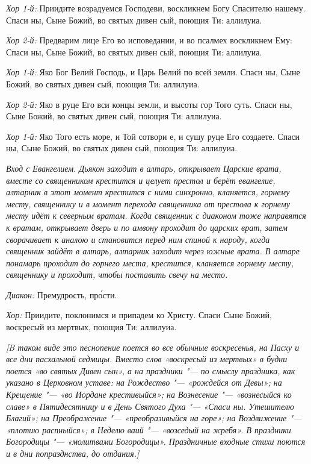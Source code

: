\begin{mymulticols}
{\itshape Хор 1-й:} Приидите возрадуемся Господеви, воскликнем Богу Спасителю нашему. Спаси ны, Сыне Божий, во святых дивен сый, поющия Ти: аллилуиа. 

{\itshape Хор 2-й:} Предварим лице Его во исповедании, и во псалмех воскликнем Ему: Спаси ны, Сыне Божий, во святых дивен сый, поющия Ти: аллилуиа. 

{\itshape Хор 1-й:} Яко Бог Велий Господь, и Царь Велий по всей земли. Спаси ны, Сыне Божий, во святых дивен сый, поющия Ти: аллилуиа. 

{\itshape Хор 2-й:} Яко в руце Его вси концы земли, и высоты гор Того суть. Спаси ны, Сыне Божий, во святых дивен сый, поющия Ти: аллилуиа. 

{\itshape Хор 1-й:} Яко Того есть море, и Той сотвори е, и сушу руце Его создаете. Спаси ны, Сыне Божий, во святых дивен сый, поющия Ти: аллилуиа. 


{\itshape Вход с Евангелием. Дьякон заходит в алтарь, открывает Царские врата, вместе со священником крестится и целует престол и берёт евангелие, алтарник в этот момент крестится с ними синхронно, кланяется, горнему месту, священнику и в момент перехода священника от престола к горнему месту идёт к северным вратам. Когда священник с диаконом тоже направятся к вратам, открывает дверь и по амвону проходит до царских врат, затем сворачивает к аналою и становится перед ним спиной к народу, когда священник зайдёт в алтарь, алтарник заходит через южные врата. В алтаре понамарь проходит до горнего места, крестится, кланяется горнему месту, священнику и проходит, чтобы поставить свечу на место.}

{\itshape Диакон:} Премудрость, пр\'{о}сти.

{\itshape Хор:} Приидите, поклонимся и припадем ко Христу. Спаси Сыне Божий, воскресый из мертвых, поющия Ти: аллилуиа.

{\itshape [B таком виде это песнопение поется во все обычные воскресенья, на Пасху и все дни пасхальной седмицы. Вместо слов «воскресый из мертвых» в будни поется «во святых Дивен сын», а на праздники "--- по смыслу праздника, как указано в Церковном уставе: на Рождество "--- «рождейся от Девы»; на Крещение "--- «во Иордане крестивыйся»; на Вознесение "--- «вознесыйся ко славе» в Пятидесятницу и в День Святого Духа "--- «Спаси ны. Утешителю Благий»; на Преображение "--- «преобразивыйся на горе»; на Воздвижение "--- «плотию распныйся»; в Неделю ваий "--- «возседый на жребя». В праздники Богородицы "--- «молитвами Богородицы». Праздничные входные стихи поются и в дни попразднства, до отдания.]}


\end{mymulticols}
